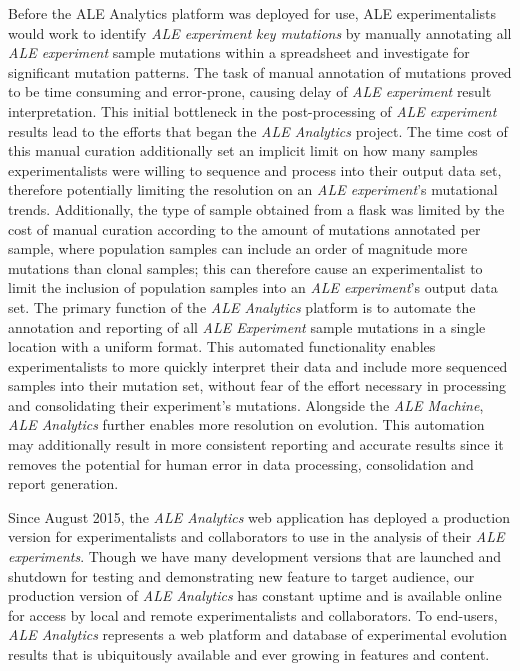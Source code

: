 \documentclass[12pt,final,masters,chapterheads]{ucsd}  %
\begin{document}
%
%
Before the ALE Analytics platform was deployed for use, ALE experimentalists would work to identify \textit{ALE experiment} \textit{key mutations} by manually annotating all \textit{ALE experiment} sample mutations within a spreadsheet and investigate for significant mutation patterns. The task of manual annotation of mutations proved to be time consuming and error-prone, causing delay of \textit{ALE experiment} result interpretation. This initial bottleneck in the post-processing of \textit{ALE experiment} results lead to the efforts that began the \textit{ALE Analytics} project. The time cost of this manual curation additionally set an implicit limit on how many samples experimentalists were willing to sequence and process into their output data set, therefore potentially limiting the resolution on an \textit{ALE experiment}'s mutational trends. Additionally, the type of sample obtained from a flask was limited by the cost of manual curation according to the amount of mutations annotated per sample, where population samples can include an order of magnitude more mutations than clonal samples; this can therefore cause an experimentalist to limit the inclusion of population samples into an \textit{ALE experiment}'s output data set. The primary function of the \textit{ALE Analytics} platform is to automate the annotation and reporting of all \textit{ALE Experiment} sample mutations in a single location with a uniform format. This automated functionality enables experimentalists to more quickly interpret their data and include more sequenced samples into their mutation set, without fear of the effort necessary in processing and consolidating their experiment's mutations. Alongside the \textit{ALE Machine}, \textit{ALE Analytics} further enables more resolution on evolution. This automation may additionally result in more  consistent reporting and accurate results since it removes the potential for human error in data processing, consolidation and report generation.

Since August 2015, the\textit{ ALE Analytics} web application has deployed a production version for experimentalists and collaborators to use in the analysis of their \textit{ALE experiments}. Though we have many development versions that are launched and shutdown for testing and demonstrating new feature to target audience, our production version of\textit{ ALE Analytics} has constant uptime and is available online for access by local and remote experimentalists and collaborators. To end-users, \textit{ALE Analytics} represents a web platform and database of experimental evolution results that is ubiquitously available and ever growing in features and content.
\end{document}
